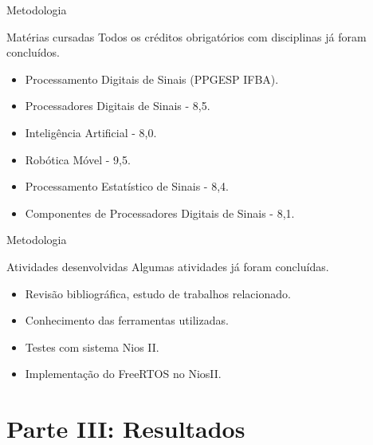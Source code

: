 \documentclass[10pt]{beamer}
\begin{document}
{
\begin{frame}{Metodologia}
	\begin{alertblock}{Matérias cursadas}
	Todos os créditos obrigatórios com disciplinas já foram concluídos.
	    \begin{itemize}
	        \item Processamento Digitais de Sinais (PPGESP IFBA).
	        \item Processadores Digitais de Sinais - 8,5.
	        \item Inteligência Artificial - 8,0.
	        \item Robótica Móvel - 9,5.
	        \item Processamento Estatístico de Sinais - 8,4.
	        \item Componentes de Processadores Digitais de Sinais - 8,1.
	    \end{itemize}
	\end{alertblock}
	
\end{frame}
}

{
\begin{frame}{Metodologia}
	\begin{alertblock}{Atividades desenvolvidas}
	Algumas atividades já foram concluídas.
	    \begin{itemize}
	        \item Revisão bibliográfica, estudo de trabalhos relacionado.
	        \item Conhecimento das ferramentas utilizadas.
	        \item Testes com sistema Nios II.
	        \item Implementação do FreeRTOS no NiosII.
	    \end{itemize}
	\end{alertblock}
	
\end{frame}
}



\section{Parte III: Resultados}
\end{document}
